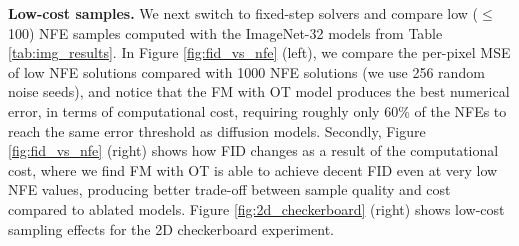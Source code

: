 \documentclass{article}
\renewcommand{\ra}[1]{\renewcommand{\arraystretch}{#1}}
\begin{document}
%

\textbf{Low-cost samples.} We next switch to fixed-step solvers and compare low ($\leq$100) NFE samples computed with the ImageNet-32 models from Table \ref{tab:img_results}. 
In Figure \ref{fig:fid_vs_nfe} (left), we compare the per-pixel MSE of low NFE solutions compared with 1000 NFE solutions (we use 256 random noise seeds), and notice that the FM with OT model produces the best numerical error, in terms of computational cost, requiring roughly only 60\% of the NFEs to reach the same error threshold as diffusion models. Secondly, Figure \ref{fig:fid_vs_nfe} (right) shows how FID changes as a result of the computational cost, where we find FM with OT is able to achieve decent FID even at very low NFE values, producing better trade-off between sample quality and cost compared to ablated models. Figure \ref{fig:2d_checkerboard} (right) shows low-cost sampling effects for the 2D checkerboard experiment. \vspace{-3pt}
\end{document}
